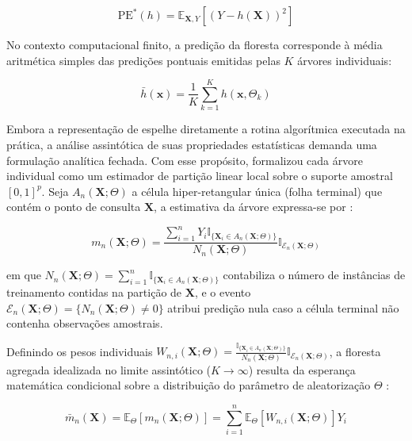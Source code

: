 \begin{equation}
    \text{PE}^*(h) = \mathbb{E}_{\mathbf{X}, Y}\left[\left(Y - h(\mathbf{X})\right)^2\right] \label{eq:erro_generalizacao_rf}
\end{equation}

\noindent No contexto computacional finito, a predição da floresta corresponde à média aritmética simples das predições pontuais emitidas pelas $K$ árvores individuais:

\begin{equation}
    \bar{h}(\mathbf{x}) = \frac{1}{K} \sum_{k=1}^{K} h(\mathbf{x}, \Theta_k) \label{eq:predicao_rf_breiman}
\end{equation}

Embora a representação de  espelhe diretamente a rotina algorítmica executada na prática, a análise assintótica de suas propriedades estatísticas demanda uma formulação analítica fechada. Com esse propósito,  formalizou cada árvore individual como um estimador de partição linear local sobre o suporte amostral $[0, 1]^p$. Seja $A_n(\mathbf{X}; \Theta)$ a célula hiper-retangular única (folha terminal) que contém o ponto de consulta $\mathbf{X}$, a estimativa da árvore expressa-se por \cite{biau2012analysis}:

\begin{equation}
    m_n(\mathbf{X}; \Theta) = \frac{\sum_{i=1}^{n} Y_i \mathbb{I}_{\{\mathbf{X}_i \in A_n(\mathbf{X}; \Theta)\}}}{N_n(\mathbf{X}; \Theta)} \mathbb{I}_{\mathcal{E}_n(\mathbf{X}; \Theta)} \label{eq:arvore_biau}
\end{equation}

\noindent em que $N_n(\mathbf{X}; \Theta) = \sum_{i=1}^{n} \mathbb{I}_{\{\mathbf{X}_i \in A_n(\mathbf{X}; \Theta)\}}$ contabiliza o número de instâncias de treinamento contidas na partição de $\mathbf{X}$, e o evento $\mathcal{E}_n(\mathbf{X}; \Theta) = \{N_n(\mathbf{X}; \Theta) \neq 0\}$ atribui predição nula caso a célula terminal não contenha observações amostrais.

Definindo os pesos individuais $W_{n,i}(\mathbf{X}; \Theta) = \frac{\mathbb{I}_{\{\mathbf{X}_i \in A_n(\mathbf{X}; \Theta)\}}}{N_n(\mathbf{X}; \Theta)} \mathbb{I}_{\mathcal{E}_n(\mathbf{X}; \Theta)}$, a floresta agregada idealizada no limite assintótico ($K \to \infty$) resulta da esperança matemática condicional sobre a distribuição do parâmetro de aleatorização $\Theta$ \cite{biau2012analysis}:

\begin{equation}
    \bar{m}_n(\mathbf{X}) = \mathbb{E}_{\Theta}\left[m_n(\mathbf{X}; \Theta)\right] = \sum_{i=1}^{n} \mathbb{E}_{\Theta}\left[ W_{n,i}(\mathbf{X}; \Theta) \right] Y_i \label{eq:floresta_biau_pesos}
\end{equation}

